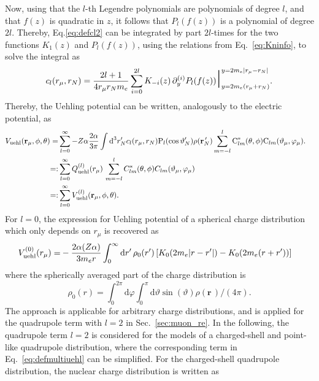 Now, using that the $l$-th Legendre polynomials are polynomials of degree $l$, and that $f(z)$ is quadratic in $z$, it follows that $P_l(f(z))$ is a polynomial of degree $2l$. Thereby, Eq.\eqref{eq:defcl2} can be integrated by part $2l$-times for the two functions $K_1(z)$ and $P_l(f(z))$, using the relations from Eq.~\eqref{eq:Kninfo}, to solve the integral as
\begin{equation}
c_l(r_\mu,r_N)=\frac{2l+1}{4 r_\mu r_N m_e}
\sum\limits_{i=0}^{2l} K_{-i}(z)\,\partial^{(i)}_yP_l(f(z))\text{\huge |}^{y=2m_e{|r_\mu - r_N|}}_{y=2m_e{(r_\mu + r_N)}}.
\label{eq:defcl3}
\end{equation}
Thereby, the Uehling potential can be written, analogously to the electric potential, as
\begin{align}
V_{\text{uehl}}(\mathbf{r}_\mu,\phi,\theta)=&\sum_{l=0}^\infty-Z\alpha\frac{2\alpha}{3\pi} 
 \int \text{d}^3r^{\prime}_N c_l(r_\mu,r_N)\text{P}_{l}(\cos \vartheta_N^{\prime})\rho(\mathbf{r}_N^{\,\prime})\sum_{m=-l}^l \text{C}^*_{lm}(\theta,\phi)\text{C}_{lm}(\vartheta_\mu,\varphi_\mu).\notag\\
=:&\sum_{l=0}^\infty Q^{(l)}_{\text{uehl}}(r_\mu)\,\sum_{m=-l}^lC^*_{lm}(\theta,\phi)C_{lm}(\vartheta_\mu,\varphi_\mu)&\notag\\
=:& \sum_{l=0}^\infty V^{(l)}_{\text{uehl}}(\mathbf{r}_\mu,\phi,\theta).
\label{eq:defmultiuehl}
\end{align}
For $l=0$, the expression for Uehling potential of a spherical charge distribution~\cite{Fullerton1976} which only depends on $r_\mu$ is recovered as
\begin{align}
\label{eq:sph_uehl}
V^{(0)}_{\text{uehl}}(r_\mu)=& -\frac{2\alpha (Z\alpha)}{3 m_e r}\int_0^\infty \text{d}r^{\prime}\,\rho_0(r^\prime)\left[K_0(2m_e|r-r^\prime|)-K_0(2m_e(r+r^\prime))\right]\notag
\end{align}
where the spherically averaged part of the charge distribution is
\begin{equation}
\rho_0(r)=\int_0^{2\pi}\text{d}\varphi\int_0^\pi\text{d}\vartheta \sin(\vartheta)\rho(\mathbf{r}\,)/(4\pi).
\end{equation}
The approach is applicable for arbitrary charge distributions, and is applied for the quadrupole term with $l=2$ in Sec.~\ref{sec:muon_re}. In the following, the quadrupole term $l=2$ is considered for the models of a charged-shell and point-like quadrupole distribution, where the corresponding term in Eq.~\eqref{eq:defmultiuehl} can be simplified. For the charged-shell quadrupole distribution, the nuclear charge distribution is written as
